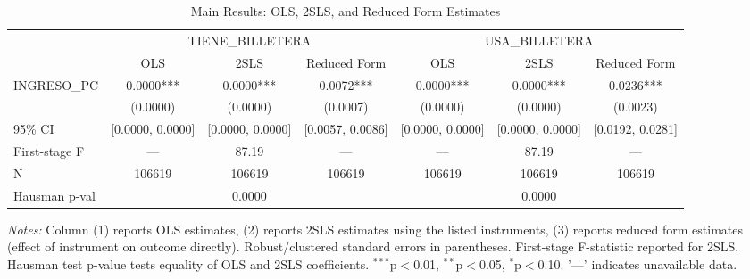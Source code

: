 \begin{table}[htbp]
\centering
\caption{Main Results: OLS, 2SLS, and Reduced Form Estimates}
\label{tab:main_results}
\begin{tabular}{l cccccc}
\toprule
 & \multicolumn{3}{c}{TIENE_BILLETERA} & \multicolumn{3}{c}{USA_BILLETERA} \\
\cmidrule(lr){2-4}
\cmidrule(lr){5-7}
 & OLS & 2SLS & Reduced Form & OLS & 2SLS & Reduced Form \\
\midrule
  INGRESO_PC & 0.0000*** & 0.0000*** & 0.0072*** & 0.0000*** & 0.0000*** & 0.0236*** \\
   & (0.0000) & (0.0000) & (0.0007) & (0.0000) & (0.0000) & (0.0023) \\
  95\% CI & [0.0000, 0.0000] & [0.0000, 0.0000] & [0.0057, 0.0086] & [0.0000, 0.0000] & [0.0000, 0.0000] & [0.0192, 0.0281] \\
\addlinespace
  First-stage F & --- & 87.19 & --- & --- & 87.19 & --- \\
  N & 106619 & 106619 & 106619 & 106619 & 106619 & 106619 \\
\addlinespace
  Hausman p-val & \multicolumn{3}{c}{0.0000} & \multicolumn{3}{c}{0.0000} \\
\bottomrule
\end{tabular}
\begin{tablenotes}
\small
\item \textit{Notes:} Column (1) reports OLS estimates, (2) reports 2SLS estimates using the listed instruments, (3) reports reduced form estimates (effect of instrument on outcome directly). Robust/clustered standard errors in parentheses. First-stage F-statistic reported for 2SLS. Hausman test p-value tests equality of OLS and 2SLS coefficients. $^{***}$p$<$0.01, $^{**}$p$<$0.05, $^{*}$p$<$0.10. '---' indicates unavailable data.
\end{tablenotes}
\end{table}